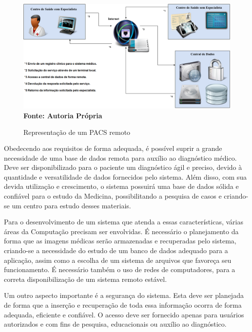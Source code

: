 \begin{figure}[ht]
	\centering	
	\caption[\hspace{0.1cm}Diagrama da Arquitetura.]{Representação de um PACS remoto}
	\vspace{-0.4cm}
	\includegraphics[width=1.0\textwidth]{figuras/diagramas/remoto.png}
	\vspace{-0.2cm}
	\\\textbf{\footnotesize Fonte: Autoria Própria }
	\label{fig:figura1}
\end{figure}

Obedecendo aos requisitos de forma adequada, é possível suprir a grande necessidade de uma base de dados remota para auxílio ao diagnóstico médico.
Deve ser disponibilizado para o paciente um diagnóstico ágil e preciso, devido à quantidade e versatilidade de dados fornecidos pelo sistema.
Além disso, com sua devida utilização e crescimento, o sistema possuirá uma base de dados sólida e confiável para o estudo da Medicina, possibilitando a pesquisa de casos e criando-se um centro para estudo desses materiais.

Para o desenvolvimento de um sistema que atenda a essas características, várias áreas da Computação precisam ser envolvidas.
É necessário o planejamento da forma que as imagens médicas serão armazenadas e recuperadas pelo sistema, criando-se a necessidade do estudo de um banco de dados adequado para a aplicação, assim como a escolha de um sistema de arquivos que favoreça seu funcionamento.
É necessário também o uso de redes de computadores, para a correta disponibilização de um sistema remoto estável.

Um outro aspecto importante é a segurança do sistema. Esta deve ser planejada de forma que a inserção e recuperação de toda essa informação ocorra de forma adequada, eficiente e confiável.
O acesso deve ser fornecido apenas para usuários autorizados e com fins de pesquisa, educacionais ou auxílio ao diagnóstico.

